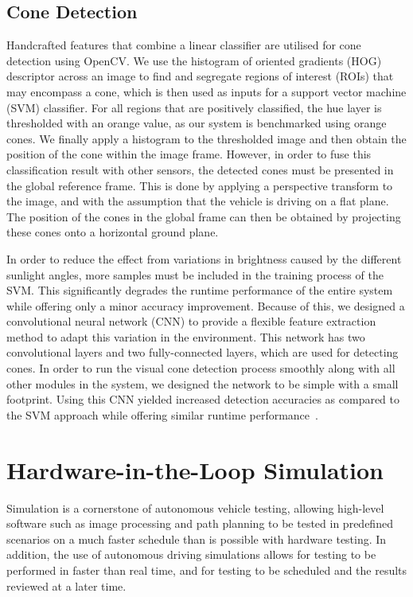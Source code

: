 \subsection{Cone Detection}\label{sec:7:conedetect}
Handcrafted features that combine a linear classifier are utilised for cone detection using OpenCV. We use the histogram of oriented gradients (HOG) descriptor across an image to find and segregate regions of interest (ROIs) that may encompass a cone, which is then used as inputs for a support vector machine (SVM) classifier. For all regions that are positively classified, the hue layer is thresholded with an orange value, as our system is benchmarked using orange cones. We finally apply a histogram to the thresholded image and then obtain the position of the cone within the image frame. However, in order to fuse this classification result with other sensors, the detected cones must be presented in the global reference frame. This is done by applying a perspective transform to the image, and with the assumption that the vehicle is driving on a flat plane. The position of the cones in the global frame can then be obtained by projecting these cones onto a horizontal ground plane.   


In order to reduce the effect from variations in brightness caused by the different sunlight angles, more samples must be included in the training process of the SVM. This significantly degrades the runtime performance of the entire system while offering only a minor accuracy improvement. Because of this, we designed a convolutional neural network (CNN) to provide a flexible feature extraction method to adapt this variation in the environment. This network has two convolutional layers and two fully-connected layers, which are used for detecting cones. In order to run the visual cone detection process smoothly along with all other modules in the system, we designed the network to be simple with a small footprint. Using this CNN yielded increased detection accuracies as compared to the SVM approach while offering similar runtime performance~\cite{girshick_region-based_2016}. 

\section{Hardware-in-the-Loop Simulation}\label{sec:7:sim}
Simulation is a cornerstone of autonomous vehicle testing, allowing high-level software such as image processing and path planning to be tested in predefined scenarios on a much faster schedule than is possible with hardware testing. In addition, the use of autonomous driving simulations allows for testing to be performed in faster than real time, and for testing to be scheduled and the results reviewed at a later time. 

